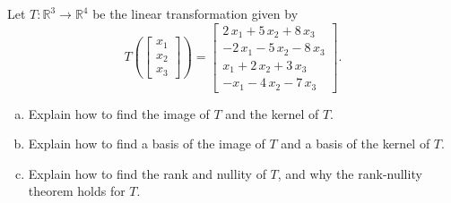 
\begin{exerciseStatement}
 Let \(T:\mathbb{R}^ 3  \to \mathbb{R}^ 4 \) be the linear transformation given by \[T\left(  \left[\begin{array}{c}
x_{1} \\
x_{2} \\
x_{3}
\end{array}\right]  \right) =  \left[\begin{array}{c}
2 \, x_{1} + 5 \, x_{2} + 8 \, x_{3} \\
-2 \, x_{1} - 5 \, x_{2} - 8 \, x_{3} \\
x_{1} + 2 \, x_{2} + 3 \, x_{3} \\
-x_{1} - 4 \, x_{2} - 7 \, x_{3}
\end{array}\right] .\]
\begin{enumerate}[(a)]
\item Explain how to find the image of \(T\) and the kernel of \(T\).
\item Explain how to find a basis of the image of \(T\) and a basis of the kernel of \(T\).
\item Explain how to find the rank and nullity of \(T\), and why the rank-nullity theorem holds for \(T\).
\end{enumerate}
    
\end{exerciseStatement}
    
